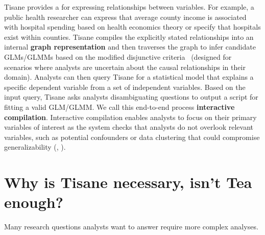 Tisane provides a \textbf{\SDSLlong} for expressing %
relationships between variables. For example, a public health researcher can
express that average county income is associated with hospital spending based on
health economics theory or specify that hospitals exist within counties.
Tisane compiles the explicitly stated relationships into an internal
\textbf{graph representation} and then traverses the graph to infer candidate
GLMs/GLMMs based on the modified disjunctive
criteria~\cite{vanderweele2019modifiedDisjunctiveCriterion} (designed for
scenarios where analysts are uncertain about the causal relationships in their
domain). Analysts can then query Tisane for a statistical model that explains a
specific dependent variable from a set of independent variables. Based on the
input query, Tisane asks analysts disambiguating questions to output a script
for fitting a valid GLM/GLMM. We call this end-to-end process \textbf{interactive
compilation}. Interactive compilation enables analysts to focus
on their primary variables of interest as the system checks that analysts do not
overlook relevant variables, such as potential confounders or data clustering
that could compromise generalizability (\higherLevel, \connectConceptualStats). 


\section{Why is Tisane necessary, isn't Tea enough?}
Many research questions analysts want to answer require more complex analyses.




